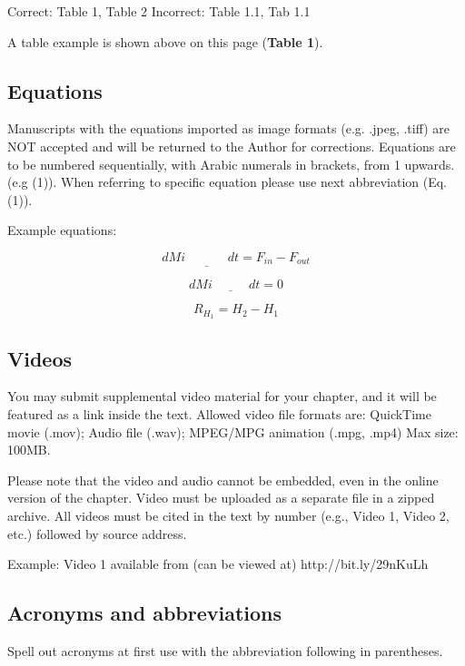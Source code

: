 \documentclass[numbers,sort&compress]{IntechOpen-Book}%
\begin{document}
Correct: Table 1, Table 2
Incorrect: Table 1.1, Tab 1.1

A table example is shown above on this page (\textbf{Table 1}).

\subsection{Equations}

Manuscripts with the equations imported as image formats (e.g. .jpeg, .tiff) are NOT accepted and will be returned to the Author for corrections. Equations are to be numbered sequentially, with Arabic numerals in brackets, from 1 upwards. (e.g (1)). When referring to specific equation please use next abbreviation (Eq. (1)).

Example equations:

\begin{equation}
d M i \underline{\phantom{abcdefg}} dt = F_{in} - F_{out}
\end{equation}

\begin{equation}
d M i \underline{\phantom{abcdef}} dt = 0
\end{equation}

\begin{equation}
R_{H_1}= H_2 - H_1
\end{equation}

\subsection{Videos}

You may submit supplemental video material for your chapter, and it will be featured as a link inside the text. Allowed video file formats are: QuickTime movie (.mov); Audio file (.wav); MPEG/MPG animation (.mpg, .mp4) Max size: 100MB.

Please note that the video and audio cannot be embedded, even in the online version of the chapter. Video must be uploaded as a separate file in a zipped archive. All videos must be cited in the text by number (e.g., Video 1, Video 2, etc.) followed by source address.

Example: Video 1 available from (can be viewed at) http://bit.ly/29nKuLh

\subsection{Acronyms and abbreviations}

Spell out acronyms at first use with the abbreviation following in parentheses.
\end{document}
